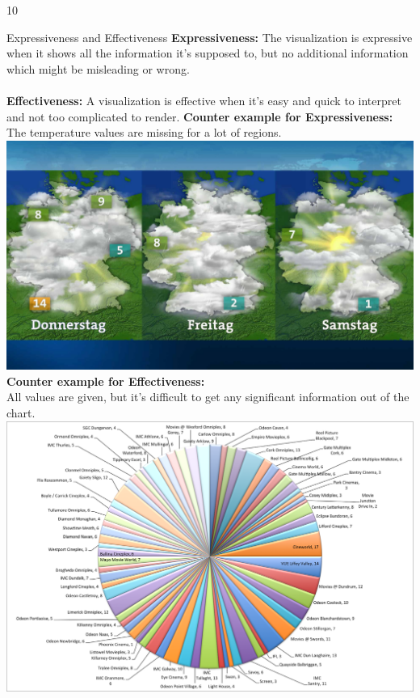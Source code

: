 \documentclass{article}
\begin{document}
\begin{ukon-infie}[24.01.18]{10}
		\begin{exercise}[p=5]{Expressiveness and Effectiveness}
			\question{}
			{
				\textbf{Expressiveness:} The visualization is expressive when it shows all the information it's supposed to, but no additional information which might be misleading or wrong.\\\\
				\textbf{Effectiveness:} A visualization is effective when it's easy and quick to interpret and not too complicated to render.
			}
			\newpage
			\question{}
			{
				\textbf{Counter example for Expressiveness:}\\
				The temperature values are missing for a lot of regions.\\
				\includegraphics[scale=0.2]{effectiveness.jpg}\\
				
				\textbf{Counter example for Effectiveness:}\\
				All values are given, but it's difficult to get any significant information out of the chart.\\
				\includegraphics[scale=0.2]{expressiveness.png}
			}
			

\end{exercise}
\end{ukon-infie}
\end{document}
